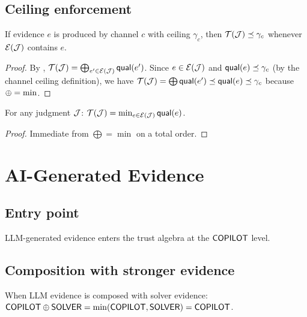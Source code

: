 \documentclass[11pt]{article}
\begin{document}
\subsection{Ceiling enforcement}

\begin{corollary}\label{cor:ceiling}
If evidence $e$ is produced by channel $c$ with ceiling
$\gamma_c$, then $\mathcal{T}(\mathcal{J}) \preceq \gamma_c$ whenever $\mathcal{E}(\mathcal{J})$
contains $e$.
\end{corollary}

\begin{proof}
By ,
$\mathcal{T}(\mathcal{J}) = \bigoplus_{e' \in \mathcal{E}(\mathcal{J})} \mathsf{qual}(e')$.
Since $e \in \mathcal{E}(\mathcal{J})$ and
$\mathsf{qual}(e) \preceq \gamma_c$ (by the channel ceiling
definition), we have
$\mathcal{T}(\mathcal{J}) = \bigoplus \mathsf{qual}(e')
\preceq \mathsf{qual}(e) \preceq \gamma_c$
because $\oplus = \min$.
\end{proof}

\begin{corollary}\label{cor:weakest-link}
For any judgment $\mathcal{J}$:
$\mathcal{T}(\mathcal{J}) = \min_{e \in \mathcal{E}(\mathcal{J})} \mathsf{qual}(e)$.
\end{corollary}

\begin{proof}
Immediate from $\bigoplus = \min$ on a total order.
\end{proof}


\section{AI-Generated Evidence}\label{sec:ai}

\subsection{Entry point}

LLM-generated evidence enters the trust algebra at the
$\mathsf{COPILOT}$ level.

\subsection{Composition with stronger evidence}

When LLM evidence is composed with solver evidence:
$\mathsf{COPILOT} \oplus \mathsf{SOLVER} = \min(\mathsf{COPILOT}, \mathsf{SOLVER}) = \mathsf{COPILOT}$.
\end{document}

